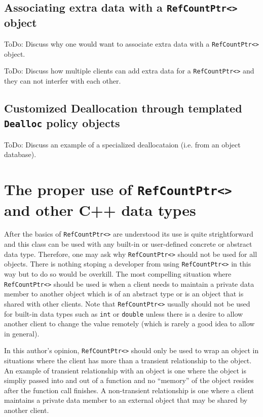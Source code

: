 %
\subsection{Associating extra data with a \texttt{RefCountPtr<>} object}
%

ToDo: Discuss why one would want to associate extra data with a \texttt{RefCountPtr<>}
object.

ToDo: Discuss how multiple clients can add extra data for a \texttt{RefCountPtr<>}
and they can not interfer with each other.

%
\subsection{Customized Deallocation through templated \texttt{Dealloc} policy objects}
%

ToDo: Discuss an example of a specialized deallocataion (i.e. from an
object database).

%
\section{The proper use of \texttt{RefCountPtr<>} and other C++ data types}
%

After the basics of \texttt{RefCountPtr<>} are understood its use is
quite strightforward and this class can be used with any built-in or
user-defined concrete or abstract data type.  Therefore, one may ask
why \texttt{RefCountPtr<>} should not be used for all objects.  There
is nothing stoping a developer from using \texttt{RefCountPtr<>} in
this way but to do so would be overkill.  The most compelling
situation where \texttt{RefCountPtr<>} should be used is when a client
needs to maintain a private data member to another object which is of
an abstract type or is an object that is shared with other clients.
Note that \texttt{RefCountPtr<>} usually should not be used for
built-in data types such as \texttt{int} or \texttt{double} unless
there is a desire to allow another client to change the value remotely
(which is rarely a good idea to allow in general).

In this author's opinion, \texttt{RefCountPtr<>} should only be used
to wrap an object in situations where the client has more than a
transient relationship to the object.  An example of transient
relationship with an object is one where the object is simpliy passed
into and out of a function and no ``memory'' of the object resides
after the function call finishes.  A non-transient relationship is one
where a client maintains a private data member to an external object
that may be shared by another client.

